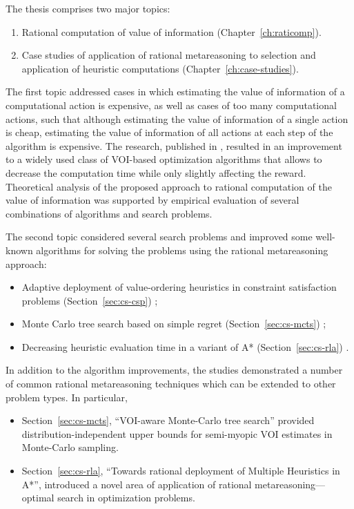 The thesis comprises two major topics:
\begin {enumerate}
\item Rational computation of value of information (Chapter~\ref{ch:raticomp}).
\item Case studies of application of rational metareasoning to
  selection and application of heuristic computations (Chapter~\ref{ch:case-studies}).
\end {enumerate}

The first topic addressed cases in which estimating the value
of information of a computational action is expensive, as well as
cases of too many computational actions, such that although
estimating the value of information of a single action is cheap,
estimating the value of information of all actions at each step of the
algorithm is expensive. The research, published in
\cite{TolpinShimony.raticomp}, resulted in an improvement to a widely
used class of VOI-based optimization algorithms that allows to decrease the
computation time while only slightly affecting the reward. Theoretical
analysis of the proposed approach to rational computation of the
value of information was supported by empirical evaluation of several
combinations of algorithms and search problems.

The second topic considered several search problems and improved some
well-known algorithms for solving the problems using the rational
metareasoning approach:
\begin {itemize}
\item Adaptive deployment of value-ordering heuristics in constraint
  satisfaction problems (Section~\ref{sec:cs-csp}) \cite{TolpinShimony.csp};
\item Monte Carlo tree search based on simple regret
  (Section~\ref{sec:cs-mcts}) \cite{TolpinShimony.mcts,HayRussellTolpinShimony.selecting};
\item Decreasing heuristic evaluation time in a variant of A*
  (Section~\ref{sec:cs-rla}) \cite{TolpinEtAl.rla}. 
\end {itemize}
In addition to the algorithm improvements, the studies demonstrated a
number of common rational metareasoning techniques which can be 
extended to other problem types. In particular,
\begin{itemize}
\item Section~\ref{sec:cs-mcts}, ``VOI-aware Monte-Carlo tree search''
provided distribution-independent upper bounds for semi-myopic VOI
estimates in Monte-Carlo sampling.
\item Section~\ref{sec:cs-rla}, ``Towards rational deployment of Multiple
Heuristics in A*'', introduced a novel area of application of rational
metareasoning---optimal search in optimization problems.
\end{itemize}

